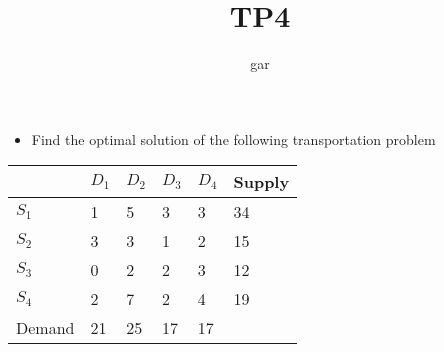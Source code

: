 \documentclass[11pt]{beamer}
\title{TP4}
\author{gar}
\date{}
\begin{document}
\maketitle

\begin{frame}[fragile]\frametitle{}
\begin{itemize}
\item Find the optimal solution of the following transportation problem
\end{itemize}

\begin{center}
\begin{tabular}{|l|p{1cm}p{1cm}p{1cm}p{1cm}|l|}
\hline
         &  $D_1$  &  $D_2$  &  $D_3$  &  $D_4$  &  Supply  \\
\hline
 $S_1$   &      1  &      5  &      3  &      3  &      34  \\
 $S_2$   &      3  &      3  &      1  &      2  &      15  \\
 $S_3$   &      0  &      2  &      2  &      3  &      12  \\
 $S_4$   &      2  &      7  &      2  &      4  &      19  \\
\hline
 Demand  &     21  &     25  &     17  &     17  &          \\
\hline
\end{tabular}
\end{center}
\end{frame}
\end{document}

